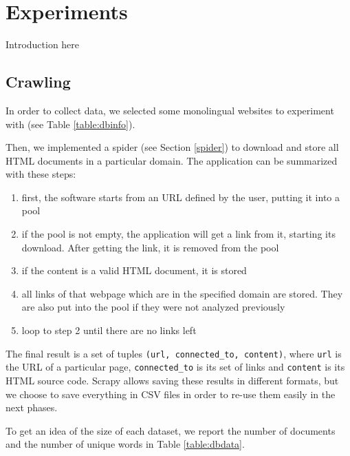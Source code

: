 \chapter{Experiments}
Introduction here

\section{Crawling}
In order to collect data, we selected some monolingual websites to experiment with (see Table \ref{table:dbinfo}).

Then, we implemented a spider (see Section \ref{spider}) to download and store all HTML documents in a particular domain.
The application can be summarized with these steps:
\begin{enumerate}
    \item first, the software starts from an URL defined by the user, putting it into a pool
    \item if the pool is not empty, the application will get a link from it, starting its download. After getting the link, it is removed from the pool
    \item if the content is a valid HTML document, it is stored
    \item all links of that webpage which are in the specified domain are stored. They are also put into the pool if they were not analyzed previously
    \item loop to step 2 until there are no links left
\end{enumerate}
The final result is a set of tuples \texttt{(url, connected\_to, content)}, where \texttt{url} is the URL of a particular page, \texttt{connected\_to} is its set of links and \texttt{content} is its HTML source code.
Scrapy allows saving these results in different formats, but we choose to save everything in CSV files in order to re-use them easily in the next phases.

To get an idea of the size of each dataset, we report the number of documents and the number of unique words in Table \ref{table:dbdata}.


